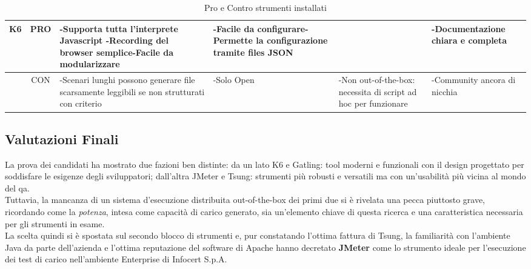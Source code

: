 \begin{table}[H]
\begin{center}
\begin{tabular}{|c|c|p{3cm}|p{3cm}|p{3cm}|p{3cm}|}
		\textbf{K6} & PRO & -Supporta tutta l'interprete Javascript \newline-Recording del browser semplice\newline-Facile da modularizzare & -Facile da configurare\newline-Permette la configurazione tramite files JSON &  & -Documentazione chiara e completa \\ \hline
		& CON & -Scenari lunghi possono generare file scarsamente leggibili se non strutturati con criterio & -Solo Open & -Non \gls{out-of-the-box}: necessita di script ad hoc per funzionare & -Community ancora di nicchia   \\ \hline
	\end{tabular}
\end{center}
\caption{Pro e Contro strumenti installati}
\end{table}
\endgroup
\subsection{Valutazioni Finali}
La prova dei candidati ha mostrato due fazioni ben distinte: da un lato K6 e Gatling: tool moderni e funzionali con il design progettato per soddisfare le esigenze degli sviluppatori; dall'altra JMeter e Tsung: strumenti più robusti e versatili ma con un'usabilità più vicina al mondo del \gls{qa}. \\
Tuttavia, la mancanza di un sistema d'esecuzione distribuita \gls{out-of-the-box} dei primi due si è rivelata una pecca piuttosto grave, ricordando come la \textit{potenza}, intesa come capacità di carico generato, sia un'elemento chiave di questa ricerca e una caratteristica necessaria per gli strumenti in esame. \\
La scelta quindi si è spostata sul secondo blocco di strumenti e, pur constatando l'ottima fattura di Tsung, la familiarità con l'ambiente Java da parte dell'azienda e l'ottima reputazione del software di Apache hanno decretato \textbf{JMeter} come lo strumento ideale per l'esecuzione dei test di carico nell'ambiente Enterprise di Infocert S.p.A.